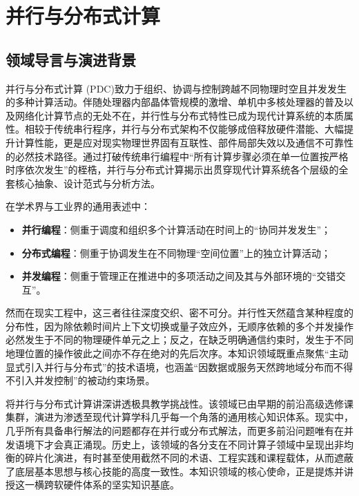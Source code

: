 \chapter{并行与分布式计算}

\section{领域导言与演进背景}

\begin{preamblebox}[知识领域概述与变革]
并行与分布式计算 (PDC)致力于组织、协调与控制跨越不同物理时空且并发发生的多种计算活动。伴随处理器内部晶体管规模的激增、单机中多核处理器的普及以及网络化计算节点的无处不在，并行性与分布式特性已成为现代计算系统的本质属性。相较于传统串行程序，并行与分布式架构不仅能够成倍释放硬件潜能、大幅提升计算性能，更是应对现实物理世界固有互联性、部件局部失效以及通信不可靠性的必然技术路径。通过打破传统串行编程中“所有计算步骤必须在单一位置按严格时序依次发生”的桎梏，并行与分布式计算揭示出贯穿现代计算系统各个层级的全套核心抽象、设计范式与分析方法。

在学术界与工业界的通用表述中：
\begin{itemize}
    \item \textbf{并行编程}：侧重于调度和组织多个计算活动在时间上的“协同并发发生”；
    \item \textbf{分布式编程}：侧重于协调发生在不同物理“空间位置”上的独立计算活动；
    \item \textbf{并发编程}：侧重于管理正在推进中的多项活动之间及其与外部环境的“交错交互”。
\end{itemize}
然而在现实工程中，这三者往往深度交织、密不可分。并行性天然蕴含某种程度的分布性，因为除依赖时间片上下文切换或量子效应外，无顺序依赖的多个并发操作必然发生于不同的物理硬件单元之上；反之，在缺乏明确通信约束时，发生于不同地理位置的操作彼此之间亦不存在绝对的先后次序。本知识领域既重点聚焦“主动显式引入并行与分布式”的技术语境，也涵盖“因数据或服务天然跨地域分布而不得不引入并发控制”的被动约束场景。

将并行与分布式计算讲深讲透极具教学挑战性。该领域已由早期的前沿高级选修课集群，演进为渗透至现代计算学科几乎每一个角落的通用核心知识体系。现实中，几乎所有具备串行解法的问题都存在并行或分布式解法，而更多前沿问题唯有在并发语境下才会真正涌现。历史上，该领域的各分支在不同计算子领域中呈现出非均衡的碎片化演进，有时甚至使用截然不同的术语、工程实践和课程载体，从而遮蔽了底层基本思想与核心技能的高度一致性。本知识领域的核心使命，正是提炼并讲授这一横跨软硬件体系的坚实知识基底。


\end{preamblebox}
